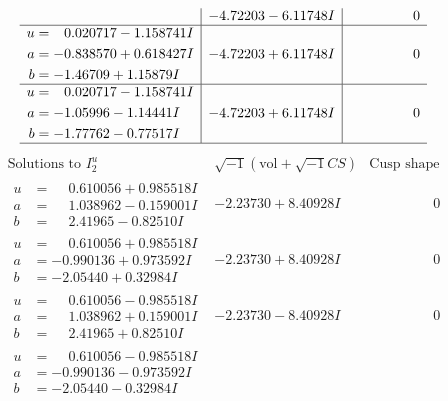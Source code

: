 \documentclass[1p]{elsarticle_modified}
\theoremstyle{definition}
\newcommand{\I}{\sqrt{-1}}
\begin{document}
$$\begin{array}{c|c|c}
 & -4.72203 - 6.11748 I & \phantom{-0.000000 } 0 \\ \hline\begin{aligned}
u &= \phantom{-}0.020717 - 1.158741 I \\
a &= -0.838570 + 0.618427 I \\
b &= -1.46709 + 1.15879 I\end{aligned}
 & -4.72203 + 6.11748 I & \phantom{-0.000000 } 0 \\ \hline\begin{aligned}
u &= \phantom{-}0.020717 - 1.158741 I \\
a &= -1.05996 - 1.14441 I \\
b &= -1.77762 - 0.77517 I\end{aligned}
 & -4.72203 + 6.11748 I & \phantom{-0.000000 } 0\\
 \hline 
 \end{array}$$\newpage$$\begin{array}{c|c|c}  
\text{Solutions to }I^u_{2}& \I (\text{vol} + \sqrt{-1}CS) & \text{Cusp shape}\\
 \hline 
\begin{aligned}
u &= \phantom{-}0.610056 + 0.985518 I \\
a &= \phantom{-}1.038962 - 0.159001 I \\
b &= \phantom{-}2.41965 - 0.82510 I\end{aligned}
 & -2.23730 + 8.40928 I & \phantom{-0.000000 } 0 \\ \hline\begin{aligned}
u &= \phantom{-}0.610056 + 0.985518 I \\
a &= -0.990136 + 0.973592 I \\
b &= -2.05440 + 0.32984 I\end{aligned}
 & -2.23730 + 8.40928 I & \phantom{-0.000000 } 0 \\ \hline\begin{aligned}
u &= \phantom{-}0.610056 - 0.985518 I \\
a &= \phantom{-}1.038962 + 0.159001 I \\
b &= \phantom{-}2.41965 + 0.82510 I\end{aligned}
 & -2.23730 - 8.40928 I & \phantom{-0.000000 } 0 \\ \hline\begin{aligned}
u &= \phantom{-}0.610056 - 0.985518 I \\
a &= -0.990136 - 0.973592 I \\
b &= -2.05440 - 0.32984 I\end{aligned}

\end{array}$$
\end{document}
